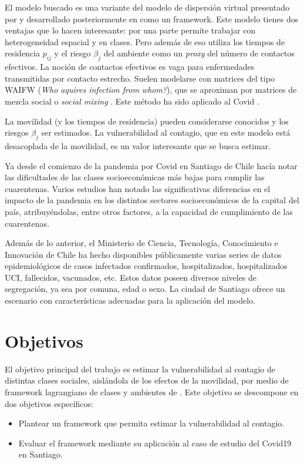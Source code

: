 \begin{intro}
El modelo buscado es una variante del modelo de dispersión virtual presentado por \cite{Bichara2015} y desarrollado posteriormente en \cite{Bichara2018} como un framework. Este modelo tienes dos ventajas que lo hacen interesante: por una parte permite trabajar con heterogeneidad espacial y en clases. Pero además de eso utiliza los tiempos de residencia \(p_{ij}\) y el riesgo \(\beta_j\) del ambiente como un \textit{proxy} del número de contactos efectivos. La noción de contactos efectivos es vaga para enfermedades transmitidas por contacto estrecho. Suelen modelarse con matrices del tipo WAIFW (\textit{Who aquires infection from whom?}), que se aproximan por matrices de mezcla social o \textit{social mixing} \cite{Mossong2008}. Este método ha sido aplicado al Covid \cite{Prem2020}. 

La movilidad (y los tiempos de residencia) pueden considerarse conocidos y los riesgos \(\beta_j\) ser estimados. La vulnerabilidad al contagio, que en este modelo está desacoplada de la movilidad, es un valor interesante que se busca estimar.

Ya desde el comienzo de la pandemia por Covid en Santiago de Chile \cite{Olivares2020} hacía notar las dificultades de las clases socioeconómicas más bajas para cumplir las cuarentenas.
Varios estudios \cite{Mena2021}\cite{Bennett2021}\cite{Gozzi2021} han notado las significativas diferencias en el impacto de la pandemia en los distintos sectores socioeconómicos de la capital del país, atribuyéndolas, entre otros factores, a la capacidad de cumplimiento de las cuarentenas. 

Además de lo anterior, el Ministerio de Ciencia, Tecnología, Conocimiento e Innovación de Chile ha hecho disponibles públicamente varias series de datos epidemiológicos de casos infectados confirmados, hospitalizados, hospitalizados UCI, fallecidos, vacunados, etc. Estos datos poseen diversos niveles de segregación, ya sea por comuna, edad o sexo. La ciudad de Santiago ofrece un escenario con características adecuadas para la aplicación del modelo.

\section*{Objetivos}

El objetivo principal del trabajo es estimar la vulnerabilidad al contagio de distintas clases sociales, aislándola de los efectos de la movilidad, por medio de framework lagrangiano de clases y ambientes de \cite{Bichara2018}. Este objetivo se descompone en dos objetivos específicos:
\begin{itemize}
    \item Plantear un framework que permita estimar la vulnerabilidad al contagio.
    \item Evaluar el framework mediante su aplicación al caso de estudio del Covid19 en Santiago.
\end{itemize}



\end{intro}

